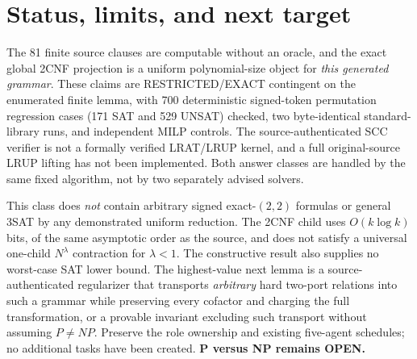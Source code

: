 \documentclass[11pt]{article}
\begin{document}
\section{Status, limits, and next target}
The 81 finite source clauses are computable without an oracle, and the exact global 2CNF projection is a uniform polynomial-size object for \emph{this generated grammar}. These claims are RESTRICTED/EXACT contingent on the enumerated finite lemma, with 700 deterministic signed-token permutation regression cases (171 SAT and 529 UNSAT) checked, two byte-identical standard-library runs, and independent MILP controls. The source-authenticated SCC verifier is not a formally verified LRAT/LRUP kernel, and a full original-source LRUP lifting has not been implemented. Both answer classes are handled by the same fixed algorithm, not by two separately advised solvers.

This class does \emph{not} contain arbitrary signed exact-$(2,2)$ formulas or general 3SAT by any demonstrated uniform reduction. The 2CNF child uses $O(k\log k)$ bits, of the same asymptotic order as the source, and does not satisfy a universal one-child $N^\lambda$ contraction for $\lambda<1$. The constructive result also supplies no worst-case SAT lower bound. The highest-value next lemma is a source-authenticated regularizer that transports \emph{arbitrary} hard two-port relations into such a grammar while preserving every cofactor and charging the full transformation, or a provable invariant excluding such transport without assuming $P\ne NP$. Preserve the role ownership and existing five-agent schedules; no additional tasks have been created. \textbf{P versus NP remains OPEN.}

\appendix
\end{document}
